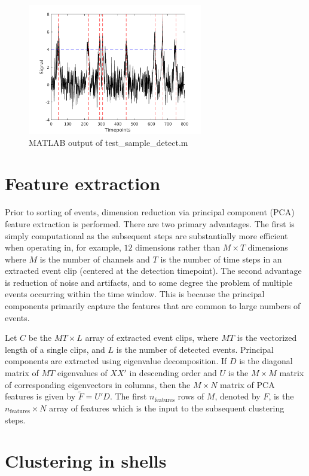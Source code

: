 \documentclass{article}
\begin{document}
\begin{figure}[h]
\caption{MATLAB output of test\_sample\_detect.m}
\includegraphics[width=3in]{test_sample_detect.png}
\end{figure}

\section{Feature extraction}

Prior to sorting of events, dimension reduction via principal component (PCA) feature extraction is performed. There are two primary advantages. The first is simply computational as the subsequent steps are substantially more efficient when operating in, for example, $12$ dimensions rather than $M\times T$ dimensions where $M$ is the number of channels and $T$ is the number of time steps in an extracted event clip (centered at the detection timepoint). The second advantage is reduction of noise and artifacts, and to some degree the problem of multiple events occurring within the time window. This is because the principal components primarily capture the features that are common to large numbers of events.

Let $C$ be the $MT \times L$ array of extracted event clips, where $MT$ is the vectorized length of a single clips, and $L$ is the number of detected events. Principal components are extracted using eigenvalue decomposition. If $D$ is the diagonal matrix of $MT$ eigenvalues of $XX'$ in descending order and $U$ is the $M\times M$ matrix of corresponding eigenvectors in columns, then the $M\times N$ matrix of PCA features is given by $\tilde{F}=U'D$. The first $n_{\text{features}}$ rows of $M$, denoted by $F$, is the $n_{\text{features}}\times N$ array of features which is the input to the subsequent clustering steps.

\section{Clustering in shells}
\end{document}
